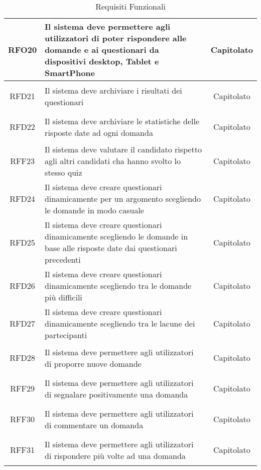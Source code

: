 \begin{longtable}{|c|>{\centering}m{7cm}|c|}
		\\ \hline
		\hypertarget{RFO20}{RFO20} & Il sistema deve permettere agli utilizzatori di poter rispondere alle domande e ai questionari da dispositivi desktop, Tablet e SmartPhone & Capitolato
		\\ \hline
		\hypertarget{RFD21}{RFD21} & Il sistema deve archiviare i risultati dei questionari & Capitolato
		\\ \hline
		\hypertarget{RFD22}{RFD22} & Il sistema deve archiviare le statistiche delle risposte date ad ogni domanda & Capitolato
		\\ \hline
		\hypertarget{RFF23}{RFF23} & Il sistema deve valutare il candidato rispetto agli altri candidati cha hanno svolto lo stesso quiz & Capitolato
		\\ \hline
		\hypertarget{RFD24}{RFD24} & Il sistema deve creare questionari dinamicamente per un argomento scegliendo le domande in modo casuale & Capitolato
		\\ \hline
		\hypertarget{RFD25}{RFD25} & Il sistema deve creare questionari dinamicamente scegliendo le domande in base alle risposte date dai questionari precedenti & Capitolato
		\\ \hline
		\hypertarget{RFD26}{RFD26} & Il sistema deve creare questionari dinamicamente scegliendo tra le domande più difficili & Capitolato
		\\ \hline
		\hypertarget{RFD27}{RFD27} & Il sistema deve creare questionari dinamicamente scegliendo tra le lacune dei partecipanti & Capitolato
		\\ \hline
		\hypertarget{RFD28}{RFD28} & Il sistema deve permettere agli utilizzatori di proporre nuove domande & Capitolato
		\\ \hline
		\hypertarget{RFF29}{RFF29} & Il sistema deve permettere agli utilizzatori di segnalare positivamente una domanda & Capitolato
		\\ \hline
		\hypertarget{RFF30}{RFF30} & Il sistema deve permettere agli utilizzatori di commentare un domanda & Capitolato
		\\ \hline
		\hypertarget{RFF31}{RFF31} & Il sistema deve permettere agli utilizzatori di rispondere più volte ad una domanda & Capitolato
\caption[Requisiti Funzionali]{Requisiti Funzionali}
\label{tabella:req0}
\end{longtable}
\clearpage
